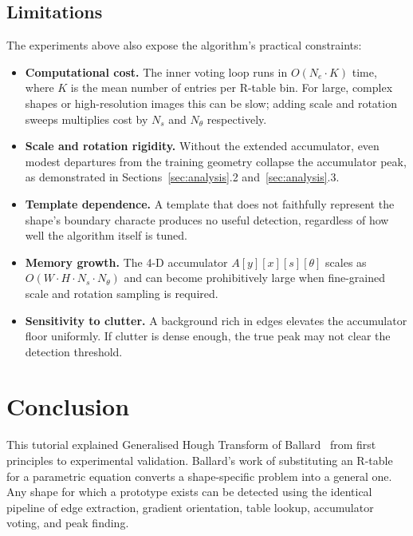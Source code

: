 \documentclass[12pt,a4paper]{article}
\begin{document}
\subsection{Limitations}

The experiments above also expose the algorithm's practical constraints:
\begin{itemize}
  \item \textbf{Computational cost.}  The inner voting loop runs in
    $O(N_e \cdot K)$ time, where $K$ is the mean number of entries per R-table bin.
    For large, complex shapes or high-resolution images this can be slow; adding
    scale and rotation sweeps multiplies cost by $N_s$ and $N_\theta$ respectively.
  \item \textbf{Scale and rotation rigidity.}  Without the extended accumulator,
    even modest departures from the training geometry collapse the accumulator peak,
    as demonstrated in Sections~\ref{sec:analysis}.2 and~\ref{sec:analysis}.3.
  \item \textbf{Template dependence.}  A template that does not faithfully represent
    the shape's boundary characte produces no useful detection, regardless of how well the algorithm
    itself is tuned.
  \item \textbf{Memory growth.}  The 4-D accumulator $A[y][x][s][\theta]$ scales as
    $O(W \cdot H \cdot N_s \cdot N_\theta)$ and can become prohibitively large when
    fine-grained scale and rotation sampling is required.
  \item \textbf{Sensitivity to clutter.}  A background rich in edges elevates the
    accumulator floor uniformly. If clutter is dense enough, the true peak may not
    clear the detection threshold.
\end{itemize}

\section{Conclusion}
\label{sec:conclusion}

This tutorial explained Generalised Hough Transform of
Ballard~\cite{ballard1981} from first principles to experimental validation. Ballard's work of substituting an R-table for a parametric equation converts
a shape-specific problem into a general one. Any shape for which a prototype exists
can be detected using the identical pipeline of edge extraction, gradient orientation,
table lookup, accumulator voting, and peak finding.
\end{document}
